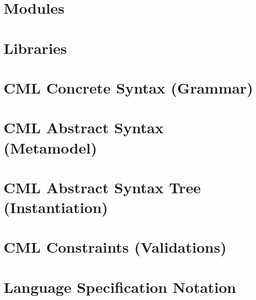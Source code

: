 \documentclass[a4paper,oneside,12pt, extrafontsizes]{memoir}
\theoremstyle{definition}
\theoremstyle{definition}
\theoremstyle{definition}
\theoremstyle{definition}
\theoremstyle{definition}
\begin{document}
\chapter{Modules}
\label{ch:modules}

\chapter{Libraries}
\label{ch:libraries}

\appendix

\chapter{CML Concrete Syntax (Grammar)}
\label{apx:concrete-syntax}


\chapter{CML Abstract Syntax (Metamodel)}
\label{apx:abstract-syntax}


\chapter{CML Abstract Syntax Tree (Instantiation)}
\label{apx:ast}


\chapter{CML Constraints (Validations)}
\label{apx:ocl}


\chapter{Language Specification Notation}
\label{apx:lsl}


\backmatter



\end{document}
